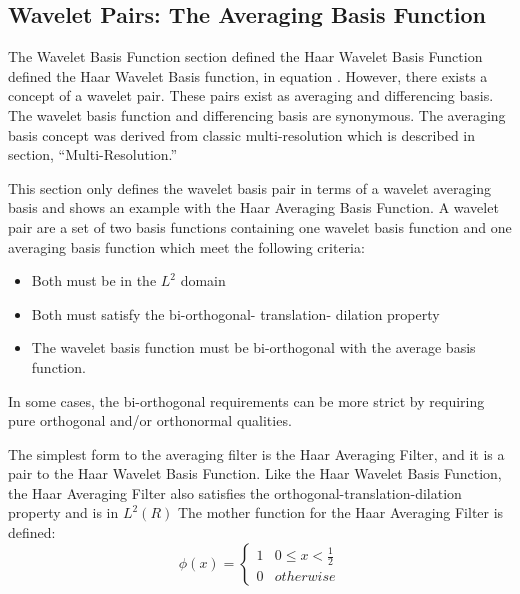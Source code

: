 \subsection {Wavelet Pairs: The Averaging Basis Function}
The Wavelet Basis Function section defined the Haar Wavelet Basis Function defined the Haar Wavelet Basis function, in equation .  However, there exists a concept of a wavelet pair.  These pairs exist as averaging and differencing basis.  The wavelet basis function and differencing basis are synonymous.  The averaging basis concept was derived from classic multi-resolution which is described in section, ``Multi-Resolution.''

This section only defines the wavelet basis pair in terms of a wavelet averaging basis %
and shows an example with the Haar Averaging Basis Function.  A wavelet pair are a set of two basis functions containing one wavelet basis function and one averaging basis function which meet the following criteria:  %
\begin{itemize}
\item Both must be in the $L^2$ domain
\item Both must satisfy the bi-orthogonal- translation- dilation property
\item The wavelet basis function must be bi-orthogonal with the average basis function.
\end{itemize}
In some cases, the bi-orthogonal requirements can be more strict by requiring pure orthogonal and/or orthonormal qualities.  

The simplest form to the averaging filter is the Haar Averaging
Filter, and it is a pair to the Haar Wavelet Basis Function.  Like the
Haar Wavelet Basis Function, the Haar Averaging Filter also satisfies
the orthogonal-translation-dilation property and is in $L^2(R)$ The
mother function for the Haar Averaging Filter is defined: \[\phi(x) =
\left\{\begin{array}{cc}1 & 0\le x < \frac{1}{2} \\0 &
{otherwise}\end{array}\right.\]
